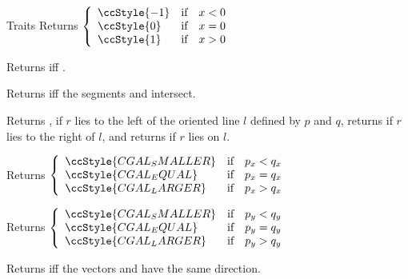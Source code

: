 \begin{ccClass} {Traits}
{
Returns
$ \left\{
  \begin{array}{lll}
     \ccStyle{-1} & \mbox{if} & x < 0 \\
     \ccStyle{0}  & \mbox{if} & x = 0 \\
     \ccStyle{1}  & \mbox{if} & x > 0
  \end{array}
  \right.$
}

{
Returns  iff .
}

{
Returns  iff the segments \ccStyle{[p1,q1]} and \ccStyle{[p2,q2]} intersect.
}

{
Returns , if $r$ lies to the left of the oriented
line $l$ defined by $p$ and $q$, returns  if $r$
lies to the right of $l$, and returns  if $r$ lies
on $l$.
}

{
Returns
$ \left\{
  \begin{array}{lll}
     \ccStyle{CGAL_SMALLER} & \mbox{if} & p_x < q_x \\
     \ccStyle{CGAL_EQUAL}   & \mbox{if} & p_x = q_x \\
     \ccStyle{CGAL_LARGER}  & \mbox{if} & p_x > q_x
  \end{array}
  \right.$
}

{
Returns
$ \left\{
  \begin{array}{lll}
     \ccStyle{CGAL_SMALLER} & \mbox{if} & p_y < q_y \\
     \ccStyle{CGAL_EQUAL}   & \mbox{if} & p_y = q_y \\
     \ccStyle{CGAL_LARGER}  & \mbox{if} & p_y > q_y
  \end{array}
  \right.$
}

{
Returns  iff the vectors  and  have the
same direction.
}

\end{ccClass}

